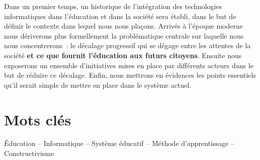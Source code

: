 Dans un premier temps, un historique de l'intégration des technologies informatiques dans l'éducation et dans la société sera établi, dans le but de définir le contexte dans lequel nous nous plaçons. Arrivés à l'époque moderne nous dériverons plus formellement la problématique centrale sur laquelle nous nous concentrerons~: le décalage progressif qui se dégage entre les attentes de la société \textbf{et ce que fournit l'éducation aux futurs citoyens}. Ensuite nous exposerons un ensemble d'initiatives mises en place par différents acteurs dans le but de réduire ce décalage. Enfin, nous mettrons en évidences les points essentiels qu'il serait simple de mettre en place dans le système actuel.

\vfill
\section*{Mots clés}
Éducation -- Informatique -- Système éducatif -- Méthode d'apprentissage -- Constructivisme